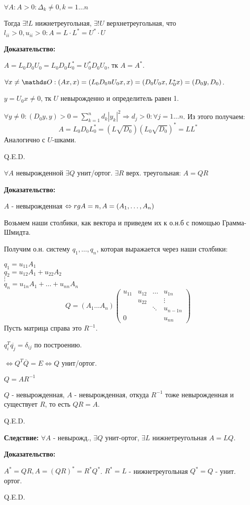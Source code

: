 
$\forall A : A>0: \Delta_k \neq 0, k = 1\ldots n$

Тогда $\exists! L$ нижнетреугольная, $\exists ! U$ верхнетреугольная, что $l_{ii}>0, u_{ii}>0:A = L \cdot L^* = U^*\cdot U$

\textbf{Доказательство:}

$A = L_0D_0 U_0 = L_0 D_0 L_0^* = U_0^* D_0 U_0$, тк $A = A^*$.

$\forall x \neq \zero : (Ax, x)  = (L_0D_0 uU_0x,x) = (D_0 U_0 x, L_0^*x) =   (D_0y,D_0)$.

$y = U_0x \neq 0 $, тк $U$ невырожденно и определитель равен 1.

$\forall y \neq 0: (D_0y,y)>0 = \sum\limits_{k=1}^n d_k |y_k|^2 \Rightarrow d_j > 0: \forall j = 1\ldots n$. Из этого получаем:
$$A = L_0 D_0 L_0^* = (L \sqrt{D_0})(L_0 \sqrt{D_0})^* = L L^*$$
Аналогично с $U$-шками.

\hfill Q.E.D.


$\forall A$ невырожденной $\exists Q$ унит/ортог. $\exists R$ верх. треугольная: $A = QR$

\textbf{Доказательство:}

$A$ - невырожденная $\Leftrightarrow rg A = n, A = (A_1,\ldots ,A_n)$

Возьмем наши столбики, как вектора и приведем их к о.н.б с помощью Грамма-Шмидта.

Получим о.н. систему $q_1,\ldots, q_n$, которая выражается через наши столбики:

$q_1 = u_{11}A_1$\\
$q_2 = u_{12}A_1 + u_{22}A_2$\\
$\vdots$\\
$q_n = u_{1n}A_1 + \ldots + u_{nn}A_n$
$$Q = (A_1 \ldots A_n) \begin{pmatrix}
    u_{11} & u_{12} & \ldots & u_{1n}\\
     & u_{22} & &\vdots\\
    & & \ddots & u_{n-1n}\\
   0 & & & u_{nn} 
\end{pmatrix}$$
Пусть матрица справа это $R^{-1}$.

$q_{i}^T \overline{q_j} = \delta_{ij}$ по построению.

$\Leftrightarrow Q^T \overline{Q} = E \Leftrightarrow Q$ унит/ортог. 

$Q = AR^{-1}$

$Q$ - невырожденная, $A$ - невырожденная, откуда $R^{-1}$ тоже невырожденная и существует $R$, то есть $QR = A$.

\hfill Q.E.D.

\textbf{Следствие:} $\forall A$ - невырожд., $\exists Q$ унит-ортог, $\exists L$ нижнетреугольная $A = LQ$.

\textbf{Доказательство:}

$A^* = QR, A = (QR)^*  = R^*Q^*$. $R^*=L$ - нижнетреугольная $Q^* = Q$ - унит. ортог.

\hfill Q.E.D.